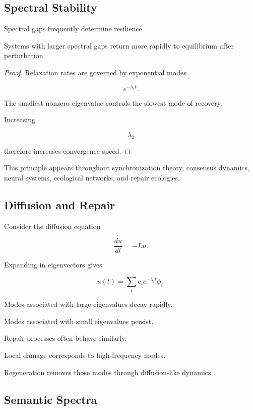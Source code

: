 \documentclass[12pt,twoside,openright]{book}
\newenvironment{prop}
{\begin{proposition}{}{}}
{\end{proposition}}
\begin{document}
\subsection{Spectral Stability}

Spectral gaps frequently determine resilience.

\begin{prop}
Systems with larger spectral gaps return more rapidly to
equilibrium after perturbation.
\end{prop}

\begin{proof}
Relaxation rates are governed by exponential modes

\[
e^{-\lambda_i t}.
\]

The smallest nonzero eigenvalue controls the slowest mode
of recovery.

Increasing

\[
\lambda_2
\]

therefore increases convergence speed.
\end{proof}

This principle appears throughout synchronization theory,
consensus dynamics, neural systems, ecological networks,
and repair ecologies.

\subsection{Diffusion and Repair}

Consider the diffusion equation

\[
\frac{du}{dt}
=

-Lu.
\]

Expanding in eigenvectors gives

\[
u(t)
=

\sum_i
c_i
e^{-\lambda_i t}
\phi_i.
\]

Modes associated with large eigenvalues decay rapidly.

Modes associated with small eigenvalues persist.

Repair processes often behave similarly.

Local damage corresponds to high-frequency modes.

Regeneration removes those modes through diffusion-like
dynamics.

\subsection{Semantic Spectra}
\end{document}
